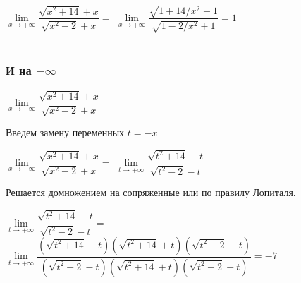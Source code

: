 $ \lim\limits_{x \to +\infty } \dfrac{ \sqrt{x^{2}+14} + x }{ \sqrt{x^{2}-2} + x } = $
$ \lim\limits_{x \to +\infty } \dfrac{ \sqrt{1+14/x^{2}} + 1 }{ \sqrt{1-2/x^{2}} + 1 } = 1 $ \\\\


\subsubsection{И на $ -\infty $}


$ \lim\limits_{x \to -\infty } \dfrac{ \sqrt{x^{2}+14} + x }{ \sqrt{x^{2}-2} + x } $

Введем замену переменных $ t = -x $

$ \lim\limits_{x \to -\infty } \dfrac{ \sqrt{x^{2}+14} + x }{ \sqrt{x^{2}-2} + x } = $
$ \lim\limits_{t \to +\infty } \dfrac{ \sqrt{t^{2}+14} - t }{ \sqrt{t^{2}-2} - t } $

Решается домножением на сопряженные или по правилу Лопиталя.

$ \lim\limits_{t \to +\infty } \dfrac{ \sqrt{t^{2}+14} - t }{ \sqrt{t^{2}-2} - t } = $
$ \lim\limits_{t \to +\infty }
\dfrac
{ (\sqrt{t^{2}+14} - t)(\sqrt{t^{2}+14} + t)(\sqrt{t^{2}-2} - t) }
{ (\sqrt{t^{2}-2} - t)(\sqrt{t^{2}+14} + t)(\sqrt{t^{2}-2} - t) } = -7$
